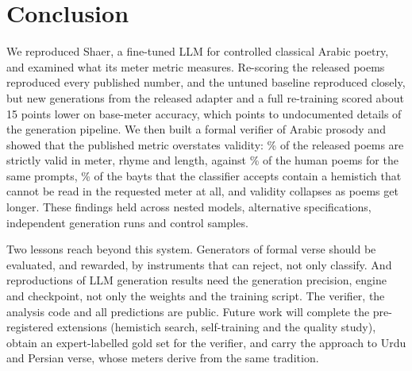 \section{Conclusion}
\label{sec:conclusion}
We reproduced Shaer, a fine-tuned LLM for controlled classical Arabic poetry, and examined what its meter metric
measures. Re-scoring the released poems reproduced every published number, and the untuned baseline reproduced
closely, but new generations from the released adapter and a full re-training scored about 15 points lower on
base-meter accuracy, which points to undocumented details of the generation pipeline. We then built a formal verifier
of Arabic prosody and showed that the published metric overstates validity: \% of the released
poems are strictly valid in meter, rhyme and length, against \% of the human poems for the same
prompts, \% of the bayts that the classifier accepts contain a hemistich that cannot be read in the
requested meter at all, and validity collapses as poems get longer. These findings held across nested models,
alternative specifications, independent generation runs and control samples.

Two lessons reach beyond this system. Generators of formal verse should be evaluated, and rewarded, by instruments that
can reject, not only classify. And reproductions of LLM generation results need the generation precision, engine and
checkpoint, not only the weights and the training script. The verifier, the analysis code and all predictions are
public. Future work will complete the pre-registered extensions (hemistich search, self-training and the quality study),
obtain an expert-labelled gold set for the verifier, and carry the approach to Urdu and Persian verse, whose meters
derive from the same tradition.
